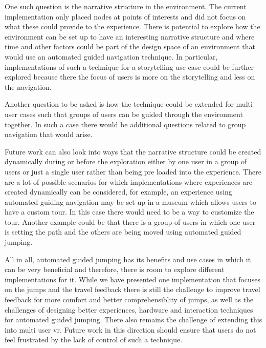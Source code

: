 One such question is the narrative structure in the environment. The current implementation only placed nodes at points of interests and did not focus on what these could provide to the experience. There is potential to explore how the environment can be set up to have an interesting narrative structure and where time and other factors could be part of the design space of an environment that would use an automated guided navigation technique. In particular, implementations of such a technique for a storytelling use case could be further explored because there the focus of users is more on the storytelling and less on the navigation.

Another question to be asked is how the technique could be extended for multi user cases such that groups of users can be guided through the environment together. In such a case there would be additional questions related to group navigation that would arise.

Future work can also look into ways that the narrative structure could be created dynamically during or before the exploration either by one user in a group of users or just a single user rather than being pre loaded into the experience. There are a lot of possible scenarios for which implementations where experiences are created dynamically can be considered, for example, an experience using automated guiding navigation may be set up in a museum which allows users to have a custom tour. In this case there would need to be a way to customize the tour. Another example could be that there is a group of users in which one user is setting the path and the others are being moved using automated guided jumping.

All in all, automated guided jumping has its benefits and use cases in which it can be very beneficial and therefore, there is room to explore different implementations for it. While we have presented one implementation that focuses on the jumps and the travel feedback there is still the challenge to improve travel feedback for more comfort and better comprehensiblity of jumps, as well as the challenges of designing better experiences, hardware and interaction techniques for automated guided jumping. There also remains the challenge of extending this into multi user \acrshort{vr}. Future work in this direction should ensure that users do not feel frustrated by the lack of control of such a technique.

 